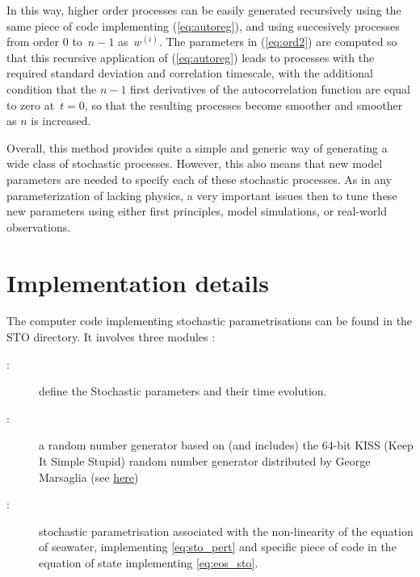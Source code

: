 \documentclass[../main/NEMO_manual]{subfiles}
\begin{document}
\noindent
In this way, higher order processes can be easily generated recursively using the same piece of code implementing
(\autoref{eq:autoreg}), and using succesively processes from order $0$ to~$n-1$ as~$w^{(i)}$.
The parameters in (\autoref{eq:ord2}) are computed so that this recursive application of
(\autoref{eq:autoreg}) leads to processes with the required standard deviation and correlation timescale,
with the additional condition that the $n-1$ first derivatives of the autocorrelation function are equal to
zero at~$t=0$, so that the resulting processes become smoother and smoother as $n$ is increased.

Overall, this method provides quite a simple and generic way of generating a wide class of stochastic processes.
However, this also means that new model parameters are needed to specify each of these stochastic processes.
As in any parameterization of lacking physics, a very important issues then to tune these new parameters using
either first principles, model simulations, or real-world observations.

\section{Implementation details}
\label{sec:STO_thech_details}



The computer code implementing stochastic parametrisations can be found in the STO directory.
It involves three modules : 
\begin{description}
\item[:]
  define the Stochastic parameters and their time evolution.
\item[:]
  a random number generator based on (and includes) the 64-bit KISS (Keep It Simple Stupid) random number generator
  distributed by George Marsaglia
  (see \href{https://groups.google.com/forum/#!searchin/comp.lang.fortran/64-bit$20KISS$20RNGs}{here})
\item[:]
  stochastic parametrisation associated with the non-linearity of the equation of seawater,
  implementing \autoref{eq:sto_pert} and specific piece of code in
  the equation of state implementing \autoref{eq:eos_sto}.
\end{description}
\end{document}
